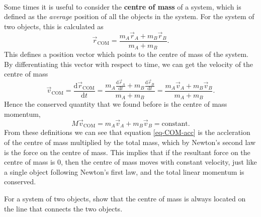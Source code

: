 \documentclass[../newtonian_mechanics.tex]{subfiles}
\begin{document}
        \paragraph{}
        Some times it is useful to consider the \textbf{centre of mass} of a system, which is defined as the \textit{average} position of all the objects in the system.
        For the system of two objects, this is calculated as
        \begin{equation}
            \vec{r}_\text{COM}=\frac{m_A\vec{r}_A + m_B\vec{r}_B}{m_A + m_B}.
        \end{equation}
        This defines a position vector which points to the centre of mass of the system.
        By differentiating this vector with respect to time, we can get the velocity of the centre of mass
        \begin{equation}
            \vec{v}_\text{COM}=\frac{\mathrm{d}\vec{r}_\text{COM}}{\mathrm{d}t}=\frac{m_A\frac{\mathrm{d}\vec{r}_A}{\mathrm{d}t} + m_B\frac{\mathrm{d}\vec{r}_B}{\mathrm{d}t}}{m_A + m_B}=\frac{m_A\vec{v}_A + m_B\vec{v}_B}{m_A + m_B}.
        \end{equation}
        Hence the conserved quantity that we found before is the centre of mass momentum,
        \begin{equation}
            M\vec{v}_\text{COM}=m_A\vec{v}_A+m_B\vec{v}_B=\text{constant}.
        \end{equation}
        From these definitions we can see that equation \ref{eq-COM-acc} is the accleration of the centre of mass multiplied by the total mass, which by Newton's second law is the force on the centre of mass.
        This implies that if the resultant force on the centre of mass is 0, then the centre of mass moves with constant velocity, just like a single object following Newton's first law, and the total linear momentum is conserved.
        \begin{example}
            For a system of two objects, show that the centre of mass is always located on the line that connects the two objects.
        \end{example}
\end{document}
